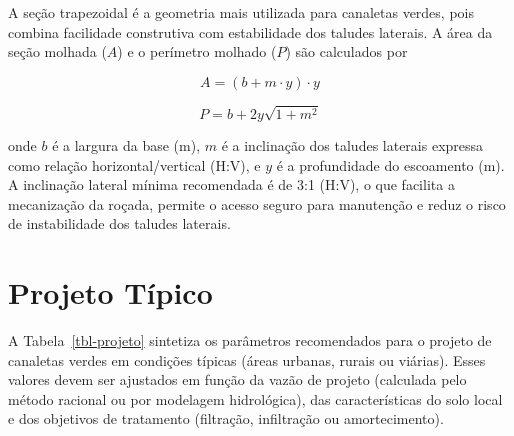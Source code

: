 \documentclass[
  portuguese,
  11pt,
  a4paper,
  open=any]{scrbook}
\begin{document}
A seção trapezoidal é a geometria mais utilizada para canaletas verdes,
pois combina facilidade construtiva com estabilidade dos taludes
laterais. A área da seção molhada (\(A\)) e o perímetro molhado (\(P\))
são calculados por

\[
A = (b + m \cdot y) \cdot y
\]

\[
P = b + 2y\sqrt{1 + m^2}
\]

onde \(b\) é a largura da base (m), \(m\) é a inclinação dos taludes
laterais expressa como relação horizontal/vertical (H:V), e \(y\) é a
profundidade do escoamento (m). A inclinação lateral mínima recomendada
é de 3:1 (H:V), o que facilita a mecanização da roçada, permite o acesso
seguro para manutenção e reduz o risco de instabilidade dos taludes
laterais.

\section{Projeto Típico}\label{projeto-tuxedpico}

A Tabela~\ref{tbl-projeto} sintetiza os parâmetros recomendados para o
projeto de canaletas verdes em condições típicas (áreas urbanas, rurais
ou viárias). Esses valores devem ser ajustados em função da vazão de
projeto (calculada pelo método racional ou por modelagem hidrológica),
das características do solo local e dos objetivos de tratamento
(filtração, infiltração ou amortecimento).
\end{document}
